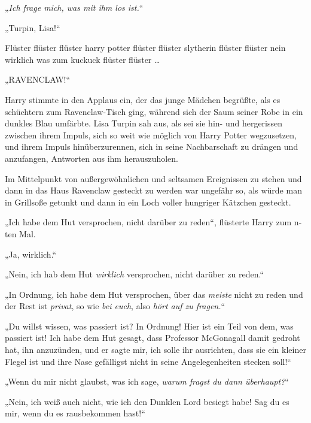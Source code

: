 

\hypertarget{selbstbeherrschung}{%

\later

„\emph{Ich frage mich, was mit ihm los ist.}“

\later

„Turpin, Lisa!“

Flüster flüster flüster harry potter flüster flüster slytherin flüster flüster nein wirklich was zum kuckuck flüster flüster …

„RAVENCLAW!“

Harry stimmte in den Applaus ein, der das junge Mädchen begrüßte, als es schüchtern zum Ravenclaw-Tisch ging, während sich der Saum seiner Robe in ein dunkles Blau umfärbte. Lisa Turpin sah aus, als sei sie hin- und hergerissen zwischen ihrem Impuls, sich so weit wie möglich von Harry Potter wegzusetzen, und ihrem Impuls hinüberzurennen, sich in seine Nachbarschaft zu drängen und anzufangen, Antworten aus ihm herauszuholen.

Im Mittelpunkt von außergewöhnlichen und seltsamen Ereignissen zu stehen und dann in das Haus Ravenclaw gesteckt zu werden war ungefähr so, als würde man in Grillsoße getunkt und dann in ein Loch voller hungriger Kätzchen gesteckt.

„Ich habe dem Hut versprochen, nicht darüber zu reden“, flüsterte Harry zum n-ten Mal.

„Ja, wirklich.“

„Nein, ich hab dem Hut \emph{wirklich} versprochen, nicht darüber zu reden.“

„In Ordnung, ich habe dem Hut versprochen, über das \emph{meiste} nicht zu reden und der Rest ist \emph{privat}, so wie \emph{bei euch}, also \emph{hört auf zu fragen.}“

„Du willst wissen, was passiert ist? In Ordnung! Hier ist ein Teil von dem, was passiert ist! Ich habe dem Hut gesagt, dass Professor McGonagall damit gedroht hat, ihn anzuzünden, und er sagte mir, ich solle ihr ausrichten, dass sie ein kleiner Flegel ist und ihre Nase gefälligst nicht in seine Angelegenheiten stecken soll!“

„Wenn du mir nicht glaubst, was ich sage, \emph{warum fragst du dann überhaupt?}“

„Nein, ich weiß auch nicht, wie ich den Dunklen Lord besiegt habe! Sag du es mir, wenn du es rausbekommen hast!“

}
